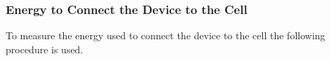 %
%
%

\subsubsection{Energy to Connect the Device to the Cell} \label{sec:performance_attach}

To measure the energy used to connect the device to the cell the following procedure is used.

